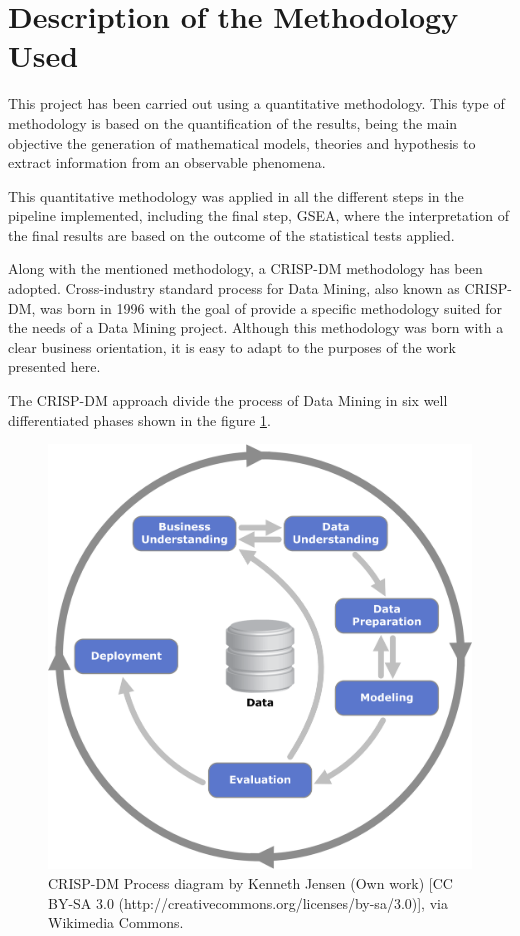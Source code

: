 \onehalfspacing

\section{Description of the Methodology Used}

This project has been carried out using a quantitative methodology. This type of methodology is based on the quantification of the results, being the main objective the generation of mathematical models, theories and hypothesis to extract information from an observable phenomena.

This quantitative methodology was applied in all the different steps in the pipeline implemented, including the final step, GSEA, where the interpretation of the final results are based on the outcome of the statistical tests applied. 

Along with the mentioned methodology, a CRISP-DM methodology has been adopted.
Cross-industry standard process for Data Mining, also known as CRISP-DM, was born in 1996 with the goal of provide a specific methodology suited for the needs of a Data Mining project. Although this methodology was born with a clear business orientation, it is easy to adapt to the purposes of the work presented here.

The CRISP-DM approach divide the process of Data Mining in six well differentiated phases shown in the figure \ref{fig:crisp-dm}.

\begin{figure}[h]
    \centering
    \includegraphics[scale=1]{../figs/CRISP-DM_Process_Diagram.png}
    \caption{CRISP-DM Process diagram by Kenneth Jensen (Own work) [CC BY-SA 3.0 (http://creativecommons.org/licenses/by-sa/3.0)], via Wikimedia Commons.}
    \label{fig:crisp-dm}
\end{figure}

